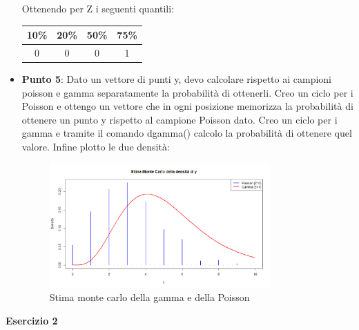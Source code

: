 \documentclass[a4paper,12pt]{article}
\begin{document}
\begin{itemize}
		Ottenendo per Z i seguenti quantili:\newline
	\begin{tabular}{|c|c|c|c|}
		\hline
		10\% & 20\% & 50\% & 75\% \\
		\hline
		0 & 0 & 0 & 1 \\
		\hline
	\end{tabular}
	\item \textbf{Punto 5}: Dato un vettore di punti y, devo calcolare rispetto ai campioni poisson e gamma separatamente la probabilità di ottenerli. Creo un ciclo per i Poisson e ottengo un vettore che in ogni posizione memorizza la probabilità di ottenere un punto y rispetto al campione Poisson dato. Creo un ciclo per i gamma e tramite il comando dgamma() calcolo la probabilità di ottenere quel valore. Infine plotto le due densità:
	\begin{figure}[h] %
		\centering %
		\includegraphics[width=0.8\textwidth]{doppiadens.png} %
		\caption{Stima monte carlo della gamma e della Poisson} %
		\label{fig:immagine} %
	\end{figure}	
\end{itemize}
\newpage
\centering \textbf{Esercizio 2}\\
\end{document}
